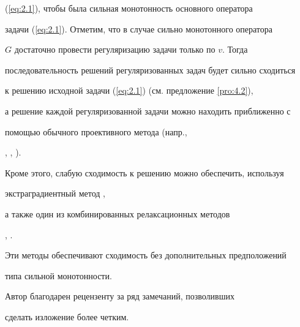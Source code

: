 (\ref{eq:2.1}), чтобы была сильная монотонность основного оператора


задачи (\ref{eq:2.1}). Отметим, что в случае сильно монотонного оператора


$G$ достаточно провести регуляризацию задачи только по $v$. Тогда 


последовательность решений регуляризованных задач будет сильно сходиться 


к решению исходной задачи (\ref{eq:2.1}) (см. предложение \ref{pro:4.2}), 


а решение каждой регуляризованной задачи можно находить приближенно с 


помощью обычного проективного метода (напр.,


\cite{HP90}, \cite{Pat99}, \cite{Kon98}).


Кроме этого, слабую сходимость к решению можно обеспечить, используя 


экстраградиентный метод \cite{Ant97},


а также один из комбинированных релаксационных методов 


\cite{Kon98}, \cite{Kon99a}.


Эти методы обеспечивают сходимость без дополнительных предположений 


типа сильной монотонности.





Автор благодарен рецензенту за ряд замечаний, позволивших


сделать изложение более четким.





